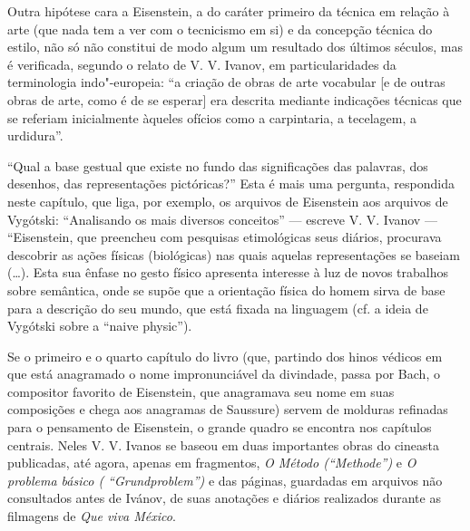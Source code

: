 Outra hipótese cara a Eisenstein, a do caráter primeiro da técnica em
relação à arte (que nada tem a ver com o tecnicismo em si) e da
concepção técnica do estilo, não só não constitui de modo algum um
resultado dos últimos séculos, mas é verificada, segundo o relato de
V. V. Ivanov, em particularidades da terminologia indo"-europeia: ``a
criação de obras de arte vocabular [e de outras obras de arte, como é
de se esperar] era descrita mediante indicações técnicas que se referiam
inicialmente àqueles ofícios como a carpintaria, a tecelagem, a
urdidura''.

``Qual a base gestual que existe no fundo das significações das
palavras, dos desenhos, das representações pictóricas?'' Esta é mais uma
pergunta, respondida neste capítulo, que liga, por exemplo, os arquivos
de Eisenstein aos arquivos de Vygótski: ``Analisando os mais diversos
conceitos'' --- escreve V. V. Ivanov --- ``Eisenstein, que preencheu com
pesquisas etimológicas seus diários, procurava descobrir as ações
físicas (biológicas) nas quais aquelas representações se baseiam (\ldots{}).
Esta sua ênfase no gesto físico apresenta interesse à luz de novos
trabalhos sobre semântica, onde se supõe que a orientação física do
homem sirva de base para a descrição do seu mundo, que está fixada na
linguagem (cf. a ideia de Vygótski sobre a ``naive physic'').

Se o primeiro e o quarto capítulo do livro (que, partindo dos hinos
védicos em que está anagramado o nome impronunciável da divindade, passa
por Bach, o compositor favorito de Eisenstein, que anagramava seu nome
em suas composições e chega aos anagramas de Saussure) servem de
molduras refinadas para o pensamento de Eisenstein, o grande quadro se
encontra nos capítulos centrais. Neles V. V. Ivanos se baseou em duas
importantes obras do cineasta publicadas, até agora, apenas em
fragmentos, \emph{O Método (``Methode'')} e \emph{O problema básico (
``Grundproblem'')} e das páginas, guardadas em arquivos não consultados
antes de Ivánov, de suas anotações e diários realizados durante as
filmagens de \emph{Que viva México}.

